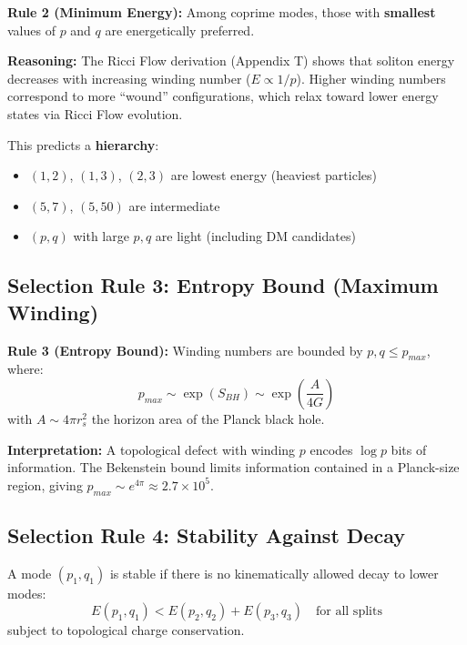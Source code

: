 \begin{mdframed}[backgroundcolor=blue!5]
\textbf{Rule 2 (Minimum Energy):} Among coprime modes, those with \textbf{smallest} values of $p$ and $q$ are energetically preferred.
\end{mdframed}

\textbf{Reasoning:} The Ricci Flow derivation (Appendix T) shows that soliton energy decreases with increasing winding number ($E \propto 1/p$). Higher winding numbers correspond to more ``wound'' configurations, which relax toward lower energy states via Ricci Flow evolution.

This predicts a \textbf{hierarchy}:
\begin{itemize}
    \item $(1,2)$, $(1,3)$, $(2,3)$ are lowest energy (heaviest particles)
    \item $(5,7)$, $(5,50)$ are intermediate
    \item $(p,q)$ with large $p,q$ are light (including DM candidates)
\end{itemize}

\subsection{Selection Rule 3: Entropy Bound (Maximum Winding)}

\begin{mdframed}[backgroundcolor=blue!5]
\textbf{Rule 3 (Entropy Bound):} Winding numbers are bounded by $p, q \leq p_{max}$, where:
\begin{equation}
    p_{max} \sim \exp(S_{BH}) \sim \exp\left( \frac{A}{4 G} \right)
\end{equation}
with $A \sim 4\pi r_s^2$ the horizon area of the Planck black hole.
\end{mdframed}

\textbf{Interpretation:} A topological defect with winding $p$ encodes $\log p$ bits of information. The Bekenstein bound limits information contained in a Planck-size region, giving $p_{max} \sim e^{4\pi} \approx 2.7 \times 10^5$.

\subsection{Selection Rule 4: Stability Against Decay}

A mode $(p_1, q_1)$ is stable if there is no kinematically allowed decay to lower modes:
\begin{equation}
    E(p_1, q_1) < E(p_2, q_2) + E(p_3, q_3) \quad \text{for all splits}
\end{equation}
subject to topological charge conservation.


